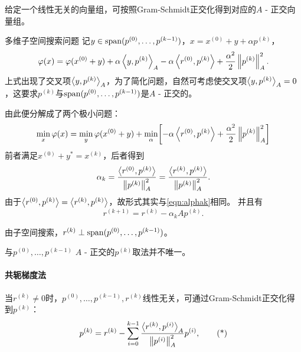 \begin{corollary}
    给定一个线性无关的向量组，可按照Gram-Schmidt正交化得到对应的$A$ - 正交向量组。
\end{corollary}

\begin{theorem}
    {多维子空间搜索问题}{}
    记$y\in\operatorname{span}(p^{(0)},\ldots,p^{(k-1)})$，$x=x^{(0)}+y+\alpha p^{(k)}$，
    \[
        \varphi(x)=\varphi(x^{(0)}+y)+\alpha\left\langle y,p^{(k)}\right\rangle_A-\alpha\left\langle r^{(0)},p^{(k)}\right\rangle+\frac{\alpha^2}2\left\lVert p^{(k)}\right\rVert^2_A.
    \]
    上式出现了交叉项$\left\langle y,p^{(k)}\right\rangle_A$，为了简化问题，自然可考虑使交叉项$\left\langle y,p^{(k)}\right\rangle_A=0$，这要求$p^{(k)}$与$\operatorname{span}(p^{(0)},\ldots,p^{(k-1)})$是$A$ - 正交的。%

    由此便分解成了两个极小问题：
    \[
        \min_x\varphi(x)=\min_y\varphi(x^{(0)}+y)+\min_\alpha\biggl[-\alpha\left\langle r^{(0)},p^{(k)}\right\rangle+\frac{\alpha^2}2\left\lVert p^{(k)}\right\rVert^2_A\biggr]
    \]
    前者满足$x^{(0)}+y^*=x^{(k)}$，后者得到
    \begin{equation}
        \alpha_k=\frac{\left\langle r^{(0)},p^{(k)}\right\rangle}{\left\lVert p^{(k)}\right\rVert_A^2}=\frac{\left\langle r^{(k)},p^{(k)}\right\rangle}{\left\lVert p^{(k)}\right\rVert_A^2}.
    \end{equation}
    由于$\left\langle r^{(0)},p^{(k)}\right\rangle=\left\langle r^{(k)},p^{(k)}\right\rangle$，故形式其实与\eqref{eqn:alphak}相同。
    并且有
    \begin{equation}
        \label{eqn:r^k+1=r^k-alpha_kAp^k}
        r^{(k+1)}=r^{(k)}-\alpha_kAp^{(k)}.
    \end{equation}
\end{theorem}

\begin{corollary}
    由子空间搜索，$r^{(k)}\perp\operatorname{span}(p^{(0)},\ldots,p^{(k-1)})$。
\end{corollary}

\begin{remark}
    与$p^{(0)},\ldots,p^{(k-1)}$ $A$ - 正交的$p^{(k)}$取法并不唯一。
\end{remark}

\paragraph{共轭梯度法}

当$r^{(k)}\neq 0$时，$p^{(0)},\ldots,p^{(k-1)},r^{(k)}$线性无关，可通过Gram-Schmidt正交化得到$p^{(k)}$：
\begin{equation}
    \label{eqn:Gram-Schmidt p^k}
    p^{(k)}=r^{(k)}-\sum_{i=0}^{k-1}\frac{\left\langle r^{(k)},p^{(i)}\right\rangle_A}{\left\lVert p^{(i)}\right\rVert_A^2}p^{(i)},
    \tag{*}
\end{equation}


